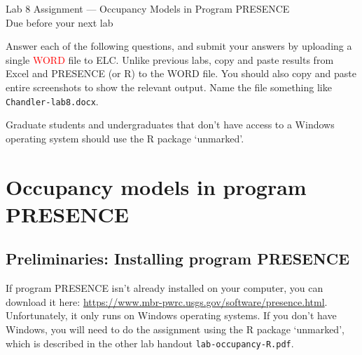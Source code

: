 \documentclass[12pt]{article}\usepackage[]{graphicx}\usepackage[]{color}
\begin{document}
{
  \Large
  \centering
  Lab 8 Assignment --- Occupancy Models in Program PRESENCE \\
  Due before your next lab \par
}

\vspace{10pt}


Answer each of the following questions, and submit your answers by
uploading a single \textcolor{red}{WORD} file to ELC. Unlike previous labs,
copy and paste results from Excel and PRESENCE (or R) to the WORD
file. You should also copy and paste entire screenshots to show the
relevant output. Name the file something like
\texttt{Chandler-lab8.docx}.

Graduate students and undergraduates that don't have access to a
Windows operating system should use the R package `unmarked'.




\section*{Occupancy models in program PRESENCE}

\subsection*{\normalsize Preliminaries: Installing program PRESENCE}

If program PRESENCE isn't already installed on your computer, you can
download it here:
\url{https://www.mbr-pwrc.usgs.gov/software/presence.html}. Unfortunately,   
it only runs on Windows operating systems. If you don't have Windows,
you will need to do the assignment using the R package
`unmarked', which is described in the other lab handout
\texttt{lab-occupancy-R.pdf}. 
\end{document}
